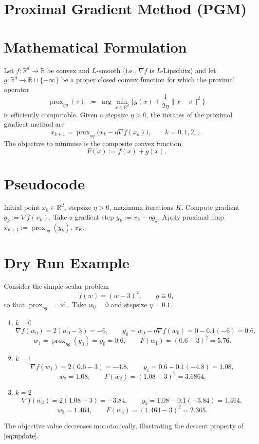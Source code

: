 \documentclass{article}
\newcommand{\prox}{\operatorname{prox}}
\begin{document}
\section*{Proximal Gradient Method (PGM)}

\section*{Mathematical Formulation}
Let $f:\mathbb{R}^d\to\mathbb{R}$ be convex and $L$‑smooth (i.e., $\nabla f$ is $L$‑Lipschitz) and let $g:\mathbb{R}^d\to\mathbb{R}\cup\{+\infty\}$ be a proper closed convex function for which the proximal operator
\[
\prox_{\eta g} (v)\;:=\;\arg\min_{x\in\mathbb{R}^d}\Big\{ g(x)+\frac{1}{2\eta}\|x-v\|^2\Big\}
\]
is efficiently computable.  
Given a stepsize $\eta>0$, the iterates of the proximal gradient method are
\begin{equation}\label{eq:update}
x_{k+1}= \prox_{\eta g}\!\bigl(x_k-\eta\nabla f(x_k)\bigr),\qquad k=0,1,2,\dots
\end{equation}
The objective to minimise is the composite convex function
\[
F(x):=f(x)+g(x).
\]

\section*{Pseudocode}
\begin{algorithm}[H]
\caption{Proximal Gradient Method}
\begin{algorithmic}[1]
\REQUIRE Initial point $x_0\in\mathbb{R}^d$, stepsize $\eta>0$, maximum iterations $K$.
    \STATE Compute gradient $g_k:=\nabla f(x_k)$.
    \STATE Take a gradient step $y_k:=x_k-\eta g_k$.
    \STATE Apply proximal map $x_{k+1}:=\prox_{\eta g}(y_k)$.
\ENDFOR
\RETURN $x_K$.
\end{algorithmic}
\end{algorithm}

\section*{Dry Run Example}
Consider the simple scalar problem
\[
f(w)=(w-3)^2,\qquad g\equiv 0,
\]
so that $\prox_{\eta g}= \operatorname{id}$.  
Take $w_0=0$ and stepsize $\eta=0.1$.

\begin{enumerate}[label=Iteration \arabic*:, leftmargin=*]
\item $k=0$  
    \[
    \nabla f(w_0)=2(w_0-3)=-6,\qquad 
    y_0=w_0-\eta\nabla f(w_0)=0-0.1(-6)=0.6,
    \]
    \[
    w_1=\prox_{\eta g}(y_0)=y_0=0.6,\qquad 
    F(w_1)= (0.6-3)^2=5.76.
    \]
\item $k=1$  
    \[
    \nabla f(w_1)=2(0.6-3)=-4.8,\qquad 
    y_1=0.6-0.1(-4.8)=1.08,
    \]
    \[
    w_2=1.08,\qquad 
    F(w_2)=(1.08-3)^2=3.6864.
    \]
\item $k=2$  
    \[
    \nabla f(w_2)=2(1.08-3)=-3.84,\qquad 
    y_2=1.08-0.1(-3.84)=1.464,
    \]
    \[
    w_3=1.464,\qquad 
    F(w_3)=(1.464-3)^2=2.365.
    \]
\end{enumerate}
The objective value decreases monotonically, illustrating the descent property of \eqref{eq:update}.
\end{document}
